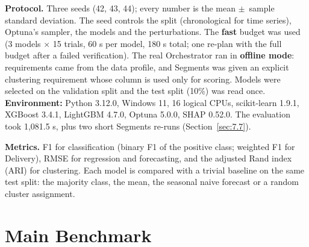 \textbf{Protocol.} Three seeds (42, 43, 44); every number is the mean \ensuremath{\pm}~sample standard deviation. The seed controls the split (chronological for time series), Optuna's sampler, the models and the perturbations. The \textbf{fast} budget was used (3 models \ensuremath{\times} 15 trials, 60 s per model, 180 s total; one re-plan with the full budget after a failed verification). The real Orchestrator ran in \textbf{offline mode}: requirements came from the data profile, and Segments was given an explicit clustering requirement whose  column is used only for scoring. Models were selected on the validation split and the test split (10\%) was read once. \textbf{Environment:} Python 3.12.0, Windows 11, 16 logical CPUs, scikit-learn 1.9.1, XGBoost 3.4.1, LightGBM 4.7.0, Optuna 5.0.0, SHAP 0.52.0. The evaluation took 1,081.5 s, plus two short Segments re-runs (Section~\ref{sec:7.7}).

\textbf{Metrics.} F1 for classification (binary F1 of the positive class; weighted F1 for Delivery), RMSE for regression and forecasting, and the adjusted Rand index (ARI) for clustering. Each model is compared with a trivial baseline on the same test split: the majority class, the mean, the seasonal naive forecast or a random cluster assignment.

\FloatBarrier
\section{Main Benchmark}\label{sec:7.2}

